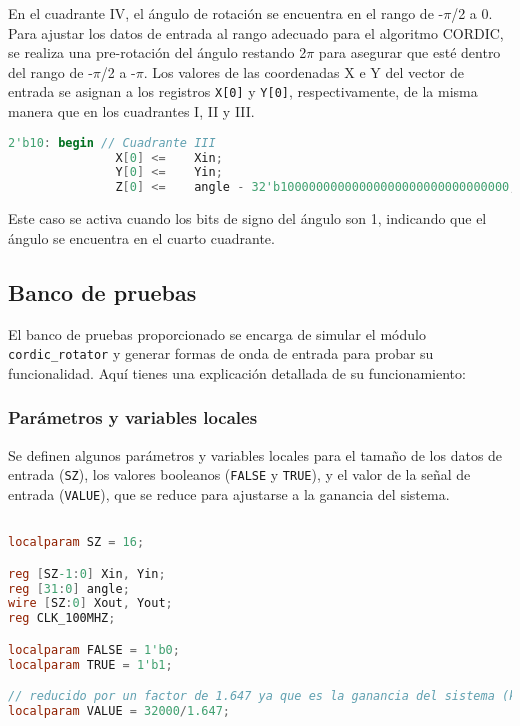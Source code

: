 \documentclass[12pt,a4paper, twoside]{article} %
\begin{document}
En el cuadrante IV, el ángulo de rotación se encuentra en el rango de -$\pi$/2 a 0. Para ajustar los datos de entrada al rango adecuado para el algoritmo CORDIC, se realiza una pre-rotación del ángulo restando 2$\pi$ para asegurar que esté dentro del rango de -$\pi$/2 a -$\pi$. Los valores de las coordenadas X e Y del vector de entrada se asignan a los registros \texttt{X[0]} y \texttt{Y[0]}, respectivamente, de la misma manera que en los cuadrantes I, II y III.


\begin{lstlisting}[language=Verilog]
       2'b10: begin // Cuadrante III
               X[0] <=    Xin;
               Y[0] <=    Yin;
               Z[0] <=    angle - 32'b10000000000000000000000000000000; 
\end{lstlisting}

Este caso se activa cuando los bits de signo del ángulo son 1, indicando que el ángulo se encuentra en el cuarto cuadrante.



\subsection{Banco de pruebas}

El banco de pruebas proporcionado se encarga de simular el módulo \texttt{cordic\_rotator} y generar formas de onda de entrada para probar su funcionalidad. Aquí tienes una explicación detallada de su funcionamiento:

\subsubsection{Parámetros y variables locales}
Se definen algunos parámetros y variables locales para el tamaño de los datos de entrada (\texttt{SZ}), los valores booleanos (\texttt{FALSE} y \texttt{TRUE}), y el valor de la señal de entrada (\texttt{VALUE}), que se reduce para ajustarse a la ganancia del sistema.

\begin{lstlisting}[language=Verilog]

localparam SZ = 16; 

reg [SZ-1:0] Xin, Yin;
reg [31:0] angle;
wire [SZ:0] Xout, Yout;
reg CLK_100MHZ;

localparam FALSE = 1'b0;
localparam TRUE = 1'b1;

// reducido por un factor de 1.647 ya que es la ganancia del sistema (k)
localparam VALUE = 32000/1.647; 

\end{lstlisting}
\end{document}

